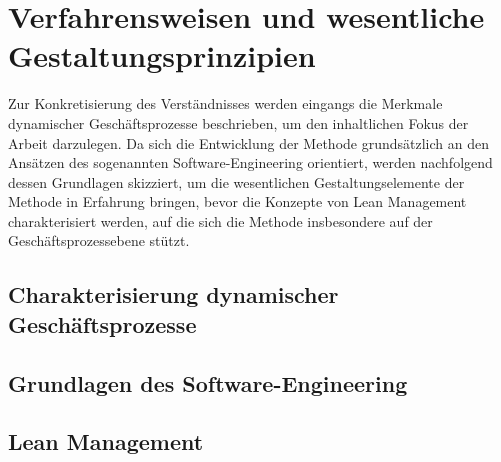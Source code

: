\section{Verfahrensweisen und wesentliche Gestaltungsprinzipien}\label{sec:methodenGrundlage}
Zur Konkretisierung des Verständnisses werden eingangs die Merkmale dynamischer Geschäftsprozesse beschrieben, um den inhaltlichen Fokus der Arbeit darzulegen.
Da sich die Entwicklung der Methode grundsätzlich an den Ansätzen des sogenannten Software-Engineering orientiert, werden nachfolgend dessen Grundlagen skizziert, um die wesentlichen Gestaltungselemente der Methode in Erfahrung bringen, bevor die Konzepte von Lean Management charakterisiert werden, auf die sich die Methode insbesondere auf der Geschäftsprozessebene stützt.

\subsection{Charakterisierung dynamischer Geschäftsprozesse}

\subsection{Grundlagen des Software-Engineering}




\cite{JorgBecker.2001}


\subsection{Lean Management}





